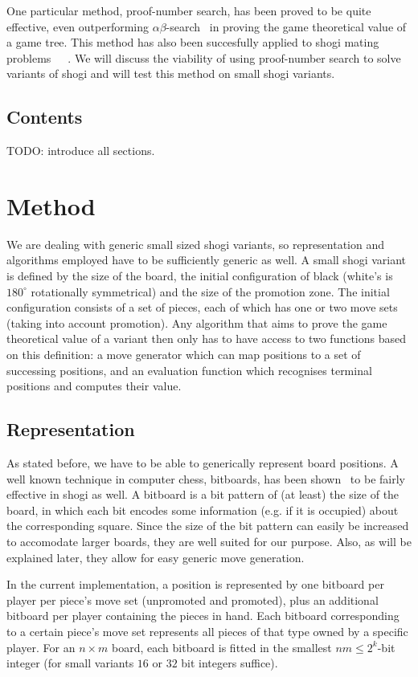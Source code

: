 \documentclass{article}
\begin{document}
One particular method, proof-number search, has been proved to be quite effective, even outperforming $\alpha\beta$-search~\cite{van2008proof} in
proving the game theoretical value of a game tree. This method has also been succesfully applied to shogi mating
problems~\cite{seo2001pn}~\cite{ueda2008weak}~\cite{sakuta2001performance}. We will discuss the viability of using proof-number search to solve variants of shogi and will test
this method on small shogi variants.

\subsection{Contents}
TODO: introduce all sections.

\section{Method}
We are dealing with generic small sized shogi variants, so representation and algorithms employed have to be sufficiently generic as well.
A small shogi variant is defined by the size of the board, the initial configuration of black (white's is $180^{\circ}$ rotationally symmetrical) and
the size of the promotion zone. The initial configuration consists of a set of pieces, each of which has one or two move sets (taking into account
promotion). Any algorithm that aims to prove the game theoretical value of a variant then only has to have access to two functions based on this
definition: a move generator which can map positions to a set of successing positions, and an evaluation function which recognises terminal
positions and computes their value.

\subsection{Representation}
As stated before, we have to be able to generically represent board positions. A well known technique in computer chess, bitboards, has been
shown~\cite{grimbergen2007using} to be fairly effective in shogi as well. A bitboard is a bit pattern of (at least) the size of the board,
in which each bit encodes some information (e.g. if it is occupied) about the corresponding square. Since the size of the bit pattern can
easily be increased to accomodate larger boards, they are well suited for our purpose. Also, as will be explained later, they allow for easy
generic move generation.

In the current implementation, a position is represented by one bitboard per player per piece's move set (unpromoted and promoted), plus an additional
bitboard per player containing the pieces in hand. Each bitboard corresponding to a certain piece's move set represents all pieces of that type
owned by a specific player. For an $n \times m$ board, each bitboard is fitted in the smallest $nm \leq 2^k$-bit integer (for small
variants $16$ or $32$ bit integers suffice). %
\end{document}
